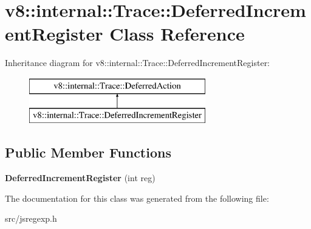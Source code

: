 \hypertarget{classv8_1_1internal_1_1_trace_1_1_deferred_increment_register}{}\section{v8\+:\+:internal\+:\+:Trace\+:\+:Deferred\+Increment\+Register Class Reference}
\label{classv8_1_1internal_1_1_trace_1_1_deferred_increment_register}
Inheritance diagram for v8\+:\+:internal\+:\+:Trace\+:\+:Deferred\+Increment\+Register\+:\begin{figure}[H]
\begin{center}
\leavevmode
\includegraphics[height=2.000000cm]{classv8_1_1internal_1_1_trace_1_1_deferred_increment_register}
\end{center}
\end{figure}
\subsection*{Public Member Functions}
\begin{DoxyCompactItemize}
\item 
\hypertarget{classv8_1_1internal_1_1_trace_1_1_deferred_increment_register_a0e35fad1c635f9dc35105672d964b4e3}{}{\bfseries Deferred\+Increment\+Register} (int reg)\label{classv8_1_1internal_1_1_trace_1_1_deferred_increment_register_a0e35fad1c635f9dc35105672d964b4e3}

\end{DoxyCompactItemize}


The documentation for this class was generated from the following file\+:\begin{DoxyCompactItemize}
\item 
src/jsregexp.\+h\end{DoxyCompactItemize}
